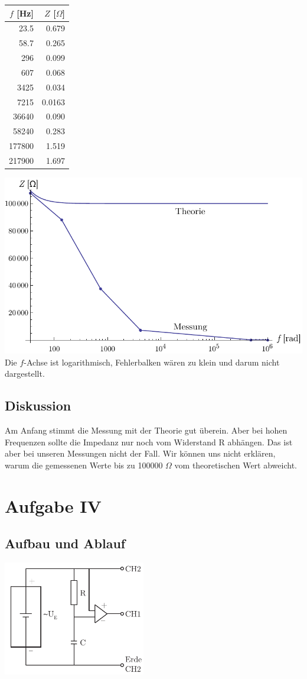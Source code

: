 \documentclass[12pt,a4paper]{article}
\begin{document}
\begin{tabular}{|r|r|}
\hline
$f$ [Hz]&$Z$ [$\Omega$]\\
\hline
23.5&0.679\\
58.7&0.265\\
296&0.099\\
607&0.068\\
3425&0.034\\
7215&0.0163\\
36640&0.090\\
58240&0.283\\
177800&1.519\\
217900&1.697\\
\hline
\end{tabular}
\vspace{10pt}

\includegraphics[width=14cm]{graph3.pdf}
Die $f$-Achse ist logarithmisch, Fehlerbalken w\"aren zu klein und darum nicht dargestellt.

\subsection*{Diskussion}
Am Anfang stimmt die Messung mit der Theorie gut \"uberein. Aber bei hohen Frequenzen sollte die Impedanz nur noch vom Widerstand R abh\"angen. Das ist aber bei unseren Messungen nicht der Fall. Wir k\"onnen uns nicht erkl\"aren, warum die gemessenen Werte bis zu 100000 $\Omega$ vom theoretischen Wert abweicht.


\section*{Aufgabe IV}
\subsection*{Aufbau und Ablauf}
\includegraphics[height=5cm]{illustration4.pdf}
\end{document}
